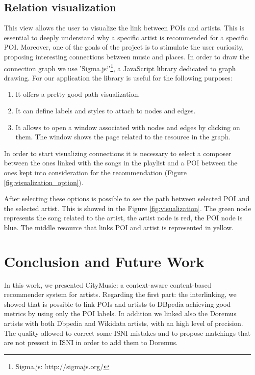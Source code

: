 \documentclass[paper=a4, fontsize=11pt]{scrartcl}
\begin{document}
\subsection{Relation visualization}
This view allows the user to visualize the link between POIs and artists. This is essential to deeply understand why a specific artist is recommended for a specific POI. Moreover, one of the goals of the project is to stimulate the user curiosity, proposing interesting connections between music and places.
In order to draw the connection graph we use 'Sigma.js`'\footnote{Sigma.js: http://sigmajs.org/}, a JavaScript library dedicated to graph drawing. For our application the library is useful for the following purposes:
\begin{enumerate}
\item It offers a pretty good path visualization.
\item It can define labels and styles to attach to nodes and edges.
\item It allows to open a window associated with nodes and edges by clicking on them. The window shows the page related to the resource in the graph.
\end{enumerate}
In order to start visualizing connections it is necessary to select a composer between the ones linked with the songs in the playlist and a POI between the ones kept into consideration for the recommendation (Figure \ref{fig:visualization_option}).

After selecting these options is possible to see the path between selected POI and the selected artist. This is showed in the Figure \ref{fig:visualization}. The green node represents the song related to the artist, the artist node is red, the POI node is blue. The middle resource that links POI and artist is represented in yellow.

\section{Conclusion and Future Work}
In this work, we presented CityMusic: a context-aware content-based recommender system for artists. 
Regarding the first part: the interlinking, we showed that is possible to link POIs and artists to DBpedia achieving good metrics by using only the POI labels. In addition we linked also the Doremus artists with both Dbpedia and Wikidata artists, with an high level of precision. The quality allowed to correct some ISNI mistakes and to propose matchings that are not present in ISNI in order to add them to Doremus. 
\end{document}
